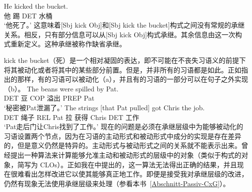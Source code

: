 \begin{exe}
\begin{xlist}[iv.]
\begin{exe}
\begin{xlist}[iv.]
\ea
\gll He kicked the bucket.\\
     他 踢 DET 水桶\\
\glt `他死了。'
\z
这意味着[Sbj kick Obj]和[Sbj kick the bucket]构式之间没有常规的承继关系。相反，只有部分信息可以从[Sbj kick Obj]构式承继。其余信息由这一次构式重新定义。这种承继被称作缺省承继。

kick the bucket（死）是一个相对凝固的表达，即不可能在不丧失习语义的前提下将其被动化或者将其中的某些部分前置\citep*[]{NSW94a}。但是，并非所有的习语都是如此。正如\citet*[]{NSW94a}指出的那样，有的习语可以被动化（a），并且有的习语的一部分可以在句子之外实现（b）。
\eal
\ex 
\gll The beans were spilled by Pat.\\
     DET 豆 COP 溢出 PREP Pat\\
\glt `秘密被Pat泄漏了。'
\ex 
\gll The strings [that Pat pulled] got Chris the job.\\
     DET 绳子 REL Pat 拉 获得 Chris DET 工作\\
\glt `Pat走后门让Chris找到了工作。'
\zl
%
%
现在的问题是必须在承继层级中为能够被动化的习语设置两个节点，因为在习语的主动形式和被动形式中成分的实现是存在差异的，但是意义仍然是特异的。主动形式与被动形式之间的关系就不能表示出来。\citet{Kay2002a}曾经提出一种算法来计算能够允准主动和被动形式的层级中的对象（类似于构式的对象，简写为 CLOs）。正如我在\citet[\S~3]{Mueller2006d}中提出的，这一算法无法得出正确的结果，并且现在很难看出怎样改进它以使其能够真正地工作。即便是接受我对承继层级的改进，仍然有现象无法使用承继层级来处理（参看本书~\ref{Abschnitt-Passiv-CxG}）。

\end{xlist}
\end{exe}
\end{xlist}
\end{exe}
